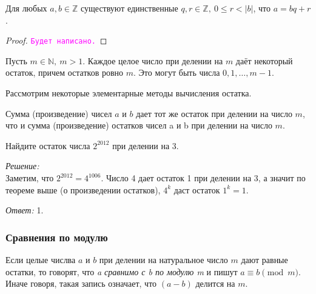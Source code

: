 \documentclass[11pt]{article}
\begin{document}
\begin{theorem}

    Для любых $a, b \in \mathbb{Z}$ существуют единственные $q, r \in \mathbb{Z}, \ 0 \le r < |b|$, что $a = bq + r$.

\end{theorem}

\begin{proof}

    \textcolor{magenta}{\texttt{Будет написано.}}

\end{proof}

\begin{corollary}

	Пусть $m \in \mathbb{N}, \ m > 1$. Каждое целое число при делении на $m$ даёт некоторый остаток, причем остатков ровно $m$.
	Это могут быть числа $0, 1, \ldots, m - 1$.

\end{corollary}

Рассмотрим некоторые элементарные методы вычисления остатка.

\begin{theorem}

	Сумма (произведение) чисел $a$ и $b$ дает тот же остаток при делении на число  $m$, что и сумма (произведение) остатков чисел a и b при делении на число $m$.

\end{theorem}

\begin{example}
	Найдите остаток числа $2^{2012}$ при делении на 3.
\end{example}
\textit{Решение:}\\
Заметим, что $2^{2012} = 4^{1006}$. Число 4  дает остаток 1 при делении на 3, а значит по теореме выше (о произведении остатков), $4^k$ даст остаток $1^k = 1$.

\textit{Ответ:} 1.

\subsubsection{Сравнения по модулю}
\begin{definition}
	Если целые числва $a$ и $b$ при делении на натуральное число $m$ дают равные остатки, то говорят, что \emph{a сравнимо с b по модулю m} и пишут $a \equiv b \pmod m$.
Иначе говоря, такая запись означает, что $(a - b)$ делится на $m$.
\end{definition}
\end{document}

